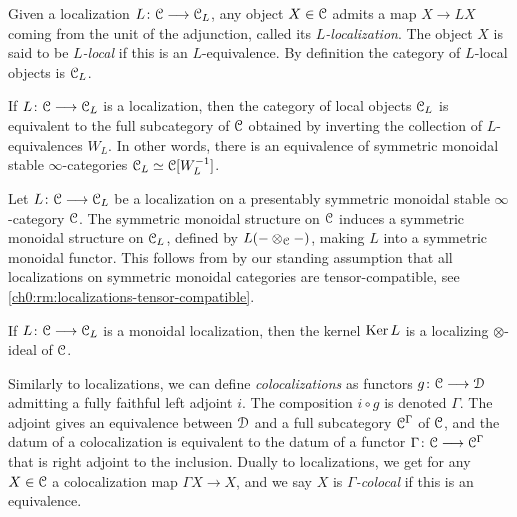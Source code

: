 \begin{definition}
    Given a localization $L\colon \EuScript{C}\longrightarrow \EuScript{C}_L$, any object $X\in \EuScript{C}$ admits a map $X\longrightarrow LX$ coming from the unit of the adjunction, called its \emph{$L$-localization}. The object $X$ is said to be \emph{$L$-local} if this is an $L$-equivalence. By definition the category of $L$-local objects is $\EuScript{C}_L$. 
\end{definition}

\begin{proposition}
    If $L\colon \EuScript{C}\longrightarrow \EuScript{C}_L$ is a localization, then the category of local objects $\EuScript{C}_L$ is equivalent to the full subcategory of $\EuScript{C}$ obtained by inverting the collection of $L$-equivalences $W_L$. In other words, there is an equivalence of symmetric monoidal stable $\infty$-categories $\EuScript{C}_L\simeq \EuScript{C}[W_L^{-1}]$.
\end{proposition}

\begin{remark}
    \label{ch0:rm:monoidal-localization}
    Let $L\colon \EuScript{C}\longrightarrow \EuScript{C}_L$ be a localization on a presentably symmetric monoidal stable $\infty$-category $\EuScript{C}$. The symmetric monoidal structure on $\EuScript{C}$ induces a symmetric monoidal structure on $\EuScript{C}_L$, defined by $L(-\otimes_{\EuScript{C}} -)$, making $L$ into a symmetric monoidal functor. This follows from \cite[2.2.1.9]{Lurie_HA} by our standing assumption that all localizations on symmetric monoidal categories are tensor-compatible, see \cref{ch0:rm:localizations-tensor-compatible}. 
\end{remark}

\begin{remark}
    If $L\colon \EuScript{C}\longrightarrow \EuScript{C}_L$ is a monoidal localization, then the kernel $\operatorname{Ker} L$ is a localizing $\otimes$-ideal of $\EuScript{C}$. 
\end{remark}

\begin{remark}
    Similarly to localizations, we can define \emph{colocalizations} as functors $g\colon \EuScript{C}\longrightarrow \EuScript{D}$ admitting a fully faithful left adjoint $i$. The composition $i\circ g$ is denoted $\Gamma$. The adjoint gives an equivalence between $\EuScript{D}$ and a full subcategory $\EuScript{C}^\Gamma$ of $\EuScript{C}$, and the datum of a colocalization is equivalent to the datum of a functor $\Gamma\colon \EuScript{C}\longrightarrow \EuScript{C}^\Gamma$ that is right adjoint to the inclusion. Dually to localizations, we get for any $X\in \EuScript{C}$ a colocalization map $\Gamma X\to X$, and we say $X$ is \emph{$\Gamma$-colocal} if this is an equivalence. 
\end{remark}

